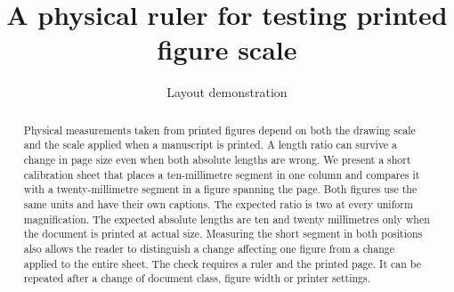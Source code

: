 \documentclass[final,5p]{elsarticle}
\begin{document}
\begin{frontmatter}
\title{A physical ruler for testing printed figure scale}
\author{Layout demonstration}

\begin{abstract}Physical measurements taken from printed figures depend on both the drawing scale and the scale applied when a manuscript is printed. A length ratio can survive a change in page size even when both absolute lengths are wrong. We present a short calibration sheet that places a ten-millimetre segment in one column and compares it with a twenty-millimetre segment in a figure spanning the page. Both figures use the same units and have their own captions. The expected ratio is two at every uniform magnification. The expected absolute lengths are ten and twenty millimetres only when the document is printed at actual size. Measuring the short segment in both positions also allows the reader to distinguish a change affecting one figure from a change applied to the entire sheet. The check requires a ruler and the printed page. It can be repeated after a change of document class, figure width or printer settings.\end{abstract}
\end{frontmatter}

\end{document}
